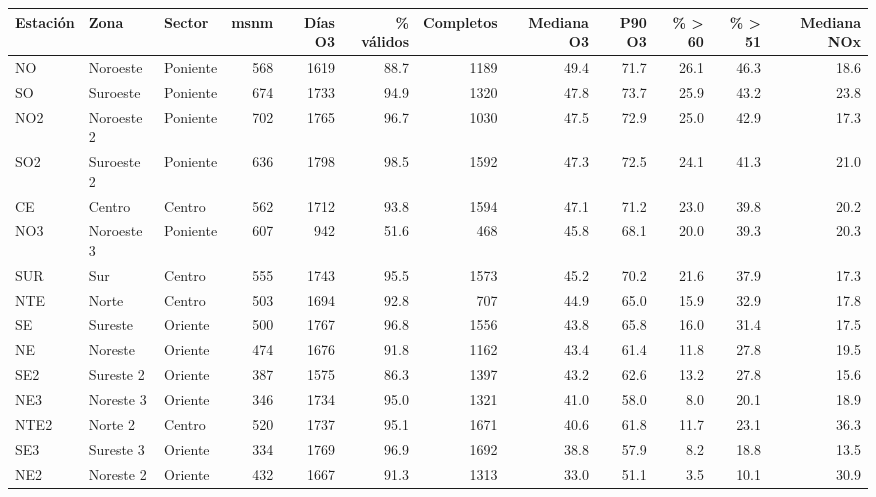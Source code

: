 
\begin{tabular}{lllrrrrrrrrr}
\toprule
Estación & Zona & Sector & msnm & Días O3 & \% válidos & Completos & Mediana O3 & P90 O3 & \% > 60 & \% > 51 & Mediana NOx\\
\midrule
NO & Noroeste & Poniente & 568 & 1619 & 88.7 & 1189 & 49.4 & 71.7 & 26.1 & 46.3 & 18.6\\
SO & Suroeste & Poniente & 674 & 1733 & 94.9 & 1320 & 47.8 & 73.7 & 25.9 & 43.2 & 23.8\\
NO2 & Noroeste 2 & Poniente & 702 & 1765 & 96.7 & 1030 & 47.5 & 72.9 & 25.0 & 42.9 & 17.3\\
SO2 & Suroeste 2 & Poniente & 636 & 1798 & 98.5 & 1592 & 47.3 & 72.5 & 24.1 & 41.3 & 21.0\\
CE & Centro & Centro & 562 & 1712 & 93.8 & 1594 & 47.1 & 71.2 & 23.0 & 39.8 & 20.2\\
NO3 & Noroeste 3 & Poniente & 607 & 942 & 51.6 & 468 & 45.8 & 68.1 & 20.0 & 39.3 & 20.3\\
SUR & Sur & Centro & 555 & 1743 & 95.5 & 1573 & 45.2 & 70.2 & 21.6 & 37.9 & 17.3\\
NTE & Norte & Centro & 503 & 1694 & 92.8 & 707 & 44.9 & 65.0 & 15.9 & 32.9 & 17.8\\
SE & Sureste & Oriente & 500 & 1767 & 96.8 & 1556 & 43.8 & 65.8 & 16.0 & 31.4 & 17.5\\
NE & Noreste & Oriente & 474 & 1676 & 91.8 & 1162 & 43.4 & 61.4 & 11.8 & 27.8 & 19.5\\
SE2 & Sureste 2 & Oriente & 387 & 1575 & 86.3 & 1397 & 43.2 & 62.6 & 13.2 & 27.8 & 15.6\\
NE3 & Noreste 3 & Oriente & 346 & 1734 & 95.0 & 1321 & 41.0 & 58.0 & 8.0 & 20.1 & 18.9\\
NTE2 & Norte 2 & Centro & 520 & 1737 & 95.1 & 1671 & 40.6 & 61.8 & 11.7 & 23.1 & 36.3\\
SE3 & Sureste 3 & Oriente & 334 & 1769 & 96.9 & 1692 & 38.8 & 57.9 & 8.2 & 18.8 & 13.5\\
NE2 & Noreste 2 & Oriente & 432 & 1667 & 91.3 & 1313 & 33.0 & 51.1 & 3.5 & 10.1 & 30.9\\
\bottomrule
\end{tabular}
